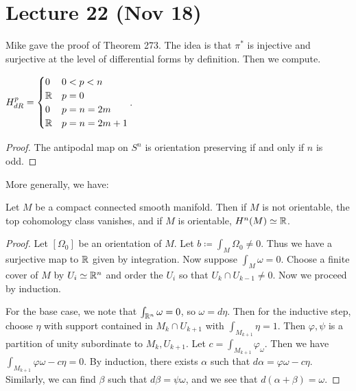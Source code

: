 \documentclass[twoside, 10pt]{article}
\begin{document}
    \section{Lecture 22 (Nov 18)}%
    \label{sec:lecture_22_nov_18_}
    
    Mike gave the proof of Theorem 273. The idea is that $\pi^*$ is injective and surjective at the level of differential forms by definition. Then we compute.

    \begin{cor}
        $H^p_{dR} = \begin{cases}
            0 & 0 < p < n \\
            \mathbb{R} & p = 0 \\
            0 & p=n=2m \\
            \mathbb{R} & p=n=2m+1
        \end{cases}$.
    \end{cor}

    \begin{proof}
        The antipodal map on $S^n$ is orientation preserving if and only if $n$ is odd.
    \end{proof}

    More generally, we have:
    \begin{thm}
        Let $M$ be a compact connected smooth manifold. Then if $M$ is not orientable, the top cohomology class vanishes, and if $M$ is orientable, $H^n(M) \simeq \mathbb{R}$.
    \end{thm}

    \begin{proof}
        Let $[\Omega_0]$ be an orientation of $M$. Let $b \coloneqq \int_M \Omega_0 \neq 0$. Thus we have a surjective map to $\mathbb{R}$ given by integration. Now suppose $\int_M \omega = 0$. Choose a finite cover of $M$ by $U_i \simeq \mathbb{R}^n$ and order the $U_i$ so that $U_k \cap U_{k-1} \neq 0$. Now we proceed by induction.

        For the base case, we note that $\int_{\mathbb{R}^n} \omega = 0$, so $\omega = d\eta$. Then for the inductive step, choose $\eta$ with support contained in $M_k \cap U_{k+1}$ with $\int_{M_{k+1}} \eta = 1$. Then $\varphi, \psi$ is a partition of unity subordinate to $M_k, U_{k+1}$. Let $c = \int_{M_{k+1}} \varphi_{\omega}$. Then we have $\int_{M_{k+1}} \varphi \omega - c \eta = 0$. By induction, there exists $\alpha$ such that $d\alpha = \varphi\omega - c\eta$. Similarly, we can find $\beta$ such that $d\beta = \psi \omega$, and we see that $d(\alpha+\beta) = \omega$.
    \end{proof}
\end{document}
